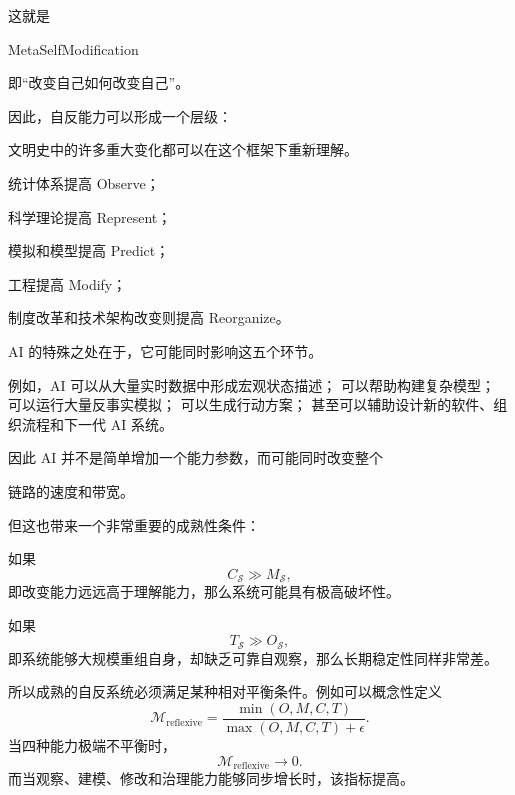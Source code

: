 这就是
\begin{statementbox}
MetaSelfModification
\end{statementbox}
即“改变自己如何改变自己”。

因此，自反能力可以形成一个层级：

\begin{statementbox}
\centering
{}
\end{statementbox}

文明史中的许多重大变化都可以在这个框架下重新理解。

统计体系提高 Observe；

科学理论提高 Represent；

模拟和模型提高 Predict；

工程提高 Modify；

制度改革和技术架构改变则提高 Reorganize。

AI 的特殊之处在于，它可能同时影响这五个环节。

例如，AI 可以从大量实时数据中形成宏观状态描述；
可以帮助构建复杂模型；
可以运行大量反事实模拟；
可以生成行动方案；
甚至可以辅助设计新的软件、组织流程和下一代 AI 系统。

因此 AI 并不是简单增加一个能力参数，而可能同时改变整个
\begin{statementbox}
\centering
{}
\end{statementbox}
链路的速度和带宽。

但这也带来一个非常重要的成熟性条件：
\begin{statementbox}
\centering
{}
\end{statementbox}

如果
\[
C_{\mathcal S}\gg M_{\mathcal S},
\]
即改变能力远远高于理解能力，那么系统可能具有极高破坏性。

如果
\[
T_{\mathcal S}\gg O_{\mathcal S},
\]
即系统能够大规模重组自身，却缺乏可靠自观察，那么长期稳定性同样非常差。

所以成熟的自反系统必须满足某种相对平衡条件。例如可以概念性定义
\[
\mathcal M_{\mathrm{reflexive}}
=
\frac{
\min(
O,M,C,T
)
}{
\max(
O,M,C,T
)+\epsilon
}.
\]
当四种能力极端不平衡时，
\[
\mathcal M_{\mathrm{reflexive}}\rightarrow0.
\]
而当观察、建模、修改和治理能力能够同步增长时，该指标提高。

